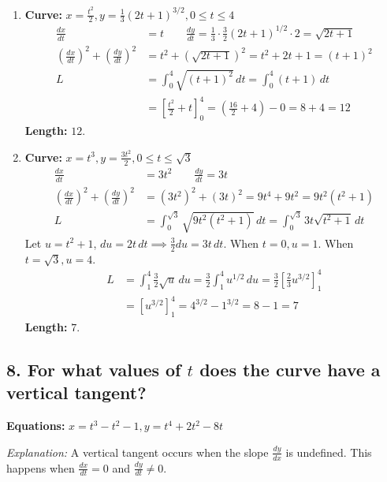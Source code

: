 \documentclass[12pt]{article}
\newcommand{\questiontitle}[1]{\subsection*{#1}}
\begin{document}
\begin{enumerate}[label=\alph*.]
    \item \textbf{Curve:} $x = \frac{t^2}{2}, y = \frac{1}{3}(2t+1)^{3/2}, 0 \le t \le 4$
    \begin{align*}
        \frac{dx}{dt} &= t \quad \quad \frac{dy}{dt} = \frac{1}{3} \cdot \frac{3}{2}(2t+1)^{1/2} \cdot 2 = \sqrt{2t+1} \\
        \left(\frac{dx}{dt}\right)^2 + \left(\frac{dy}{dt}\right)^2 &= t^2 + (\sqrt{2t+1})^2 = t^2 + 2t + 1 = (t+1)^2 \\
        L &= \int_{0}^{4} \sqrt{(t+1)^2} \,dt = \int_{0}^{4} (t+1) \,dt \\
        &= \left[ \frac{t^2}{2} + t \right]_{0}^{4} = \left(\frac{16}{2} + 4\right) - 0 = 8+4=12
    \end{align*}
    \textbf{Length:} $12$.

    \item \textbf{Curve:} $x=t^3, y=\frac{3t^2}{2}, 0 \le t \le \sqrt{3}$
    \begin{align*}
        \frac{dx}{dt} &= 3t^2 \quad \quad \frac{dy}{dt} = 3t \\
        \left(\frac{dx}{dt}\right)^2 + \left(\frac{dy}{dt}\right)^2 &= (3t^2)^2 + (3t)^2 = 9t^4 + 9t^2 = 9t^2(t^2+1) \\
        L &= \int_{0}^{\sqrt{3}} \sqrt{9t^2(t^2+1)} \,dt = \int_{0}^{\sqrt{3}} 3t\sqrt{t^2+1} \,dt
    \end{align*}
    Let $u = t^2+1$, $du=2t\,dt \implies \frac{3}{2}du = 3t\,dt$. When $t=0, u=1$. When $t=\sqrt{3}, u=4$.
    \begin{align*}
        L &= \int_{1}^{4} \frac{3}{2}\sqrt{u} \,du = \frac{3}{2} \int_{1}^{4} u^{1/2} \,du = \frac{3}{2} \left[ \frac{2}{3}u^{3/2} \right]_{1}^{4} \\
        &= \left[ u^{3/2} \right]_{1}^{4} = 4^{3/2} - 1^{3/2} = 8-1=7
    \end{align*}
    \textbf{Length:} $7$.
\end{enumerate}

\newpage
\questiontitle{8. For what values of $t$ does the curve have a vertical tangent?}

\textbf{Equations:} $x=t^3-t^2-1, y=t^4+2t^2-8t$

\textit{Explanation:} A vertical tangent occurs when the slope $\frac{dy}{dx}$ is undefined. This happens when $\frac{dx}{dt}=0$ and $\frac{dy}{dt} \ne 0$.
\end{document}
